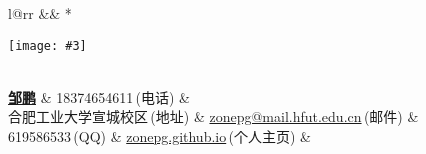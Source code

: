 \newcommand{\paint}[3]{
  \begin{minipage}{#1}
    \texttt{[image: \#3]}
  \end{minipage}
}
\newcommand{\myheader}{
  \begin{tabular*}{\textwidth}{l@{\extracolsep{\fill}}rr}
    && \multirow{4}*{\paint{2.6cm}{3.2cm}{./image.jpg}}\\
    \specialrule{0em}{4pt}{4pt}
    \textbf{\href{http://zonepg.github.io}{\LARGE 邹鹏}} & 18374654611$\,${\color{labelgrey}(电话)} &\\
    合肥工业大学宣城校区$\,${\color{labelgrey}(地址)} & \href{mailto:zhangzc@pku.edu.cn}{zonepg@mail.hfut.edu.cn}$\,${\color{labelgrey}(邮件)} & \\
    619586533$\,${\color{labelgrey}(QQ)} & \href{http://zonepg.github.io}{zonepg.github.io}$\,${\color{labelgrey}(个人主页)} & \\
  \end{tabular*}\\\vspace{0.1in}
}

\myheader


